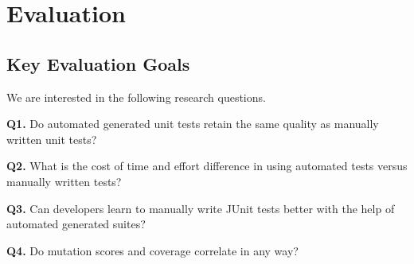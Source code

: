 \section{Evaluation}
\label{sec:evaluation}

\subsection{Key Evaluation Goals}

We are interested in the following research questions.

\textbf{Q1.} Do automated generated unit tests retain the same quality as manually written unit tests?

\textbf{Q2.} What is the cost of time and effort difference in using automated tests versus manually written tests?

\textbf{Q3.} Can developers learn to manually write JUnit tests better with the help of automated generated suites?

\textbf{Q4.} Do mutation scores and coverage correlate in any way?



